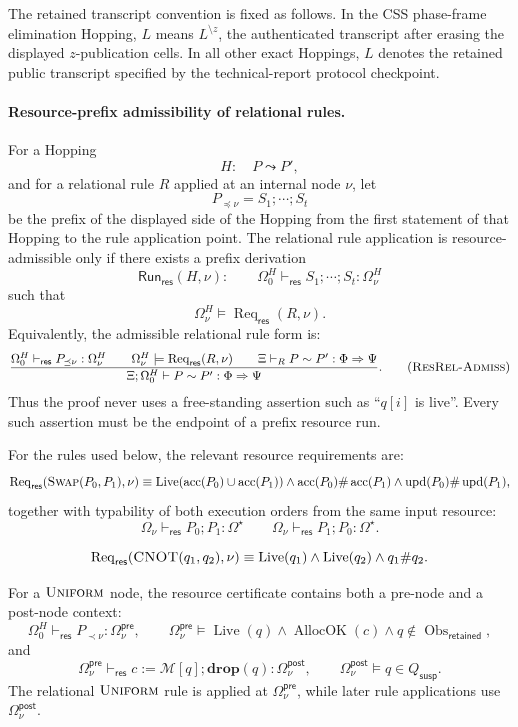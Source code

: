 \documentclass{report}
\theoremstyle{defn_style}
\providecommand{\Live}{\operatorname{Live}}
\providecommand{\AllocOK}{\operatorname{AllocOK}}
\providecommand{\Req}{\operatorname{Req}_{\mathsf{res}}}
\providecommand{\acc}{\operatorname{acc}}
\providecommand{\upd}{\operatorname{upd}}
\providecommand{\Obs}{\operatorname{Obs}}
\begin{document}
The retained transcript convention is fixed as follows.  In the CSS phase-frame
elimination Hopping, \(L\) means \(L^{\setminus z}\), the authenticated
transcript after erasing the displayed \(z\)-publication cells.  In all other
exact Hoppings, \(L\) denotes the retained public transcript specified by the
technical-report protocol checkpoint.

\paragraph{Resource-prefix admissibility of relational rules.}
For a Hopping
\[
  H:\quad P\leadsto P',
\]
and for a relational rule \(R\) applied at an internal node \(\nu\), let
\[
  P_{\preceq\nu}=S_1;\cdots;S_t
\]
be the prefix of the displayed side of the Hopping from the first statement of
that Hopping to the rule application point.  The relational rule application is
resource-admissible only if there exists a prefix derivation
\[
  \mathsf{Run}_{\mathsf{res}}(H,\nu):
  \qquad
  \Omega_0^H
  \vdash_{\mathsf{res}}
  S_1;\cdots;S_t
  :
  \Omega_\nu^H
\]
such that
\[
  \Omega_\nu^H\models \Req(R,\nu).
\]
Equivalently, the admissible relational rule form is:
\[
\frac{
  \Omega_0^H\vdash_{\mathsf{res}}P_{\preceq\nu}:\Omega_\nu^H
  \qquad
  \Omega_\nu^H\models\Req(R,\nu)
  \qquad
  \Xi\vdash_R P\sim P':\Phi\Rightarrow\Psi
}{
  \Xi;\Omega_0^H
  \vdash
  P\sim P':\Phi\Rightarrow\Psi
}.
\tag{\textsc{ResRel-Admiss}}
\]
Thus the proof never uses a free-standing assertion such as
``\(q[i]\) is live''.  Every such assertion must be the endpoint of a prefix
resource run.

For the rules used below, the relevant resource requirements are:
\[
\Req(\textsc{Swap}(P_0,P_1),\nu)
\equiv
\Live(\acc(P_0)\cup\acc(P_1))
\land
\acc(P_0)\#\acc(P_1)
\land
\upd(P_0)\#\upd(P_1),
\]
together with typability of both execution orders from the same input resource:
\[
  \Omega_\nu\vdash_{\mathsf{res}}P_0;P_1:\Omega^\star
  \qquad
  \Omega_\nu\vdash_{\mathsf{res}}P_1;P_0:\Omega^\star .
\]

\[
\Req(\textsc{CNOT}(q_1,q_2),\nu)
\equiv
\Live(q_1)\land\Live(q_2)\land q_1\#q_2 .
\]

For a \(\textsc{Uniform}\) node, the resource certificate contains both a
pre-node and a post-node context:
\[
  \Omega_0^H\vdash_{\mathsf{res}}P_{\prec\nu}:\Omega_\nu^{\mathsf{pre}},
  \qquad
  \Omega_\nu^{\mathsf{pre}}
  \models
  \Live(q)\land \AllocOK(c)\land q\notin\Obs_{\mathsf{retained}},
\tag{Uniform-Pre}
\]
and
\[
  \Omega_\nu^{\mathsf{pre}}
  \vdash_{\mathsf{res}}
  c:=\mathcal M[q];\mathbf{drop}(q)
  :
  \Omega_\nu^{\mathsf{post}},
  \qquad
  \Omega_\nu^{\mathsf{post}}\models q\in Q_{\mathsf{susp}}.
\tag{Uniform-Post}
\]
The relational \(\textsc{Uniform}\) rule is applied at
\(\Omega_\nu^{\mathsf{pre}}\), while later rule applications use
\(\Omega_\nu^{\mathsf{post}}\).
\end{document}
